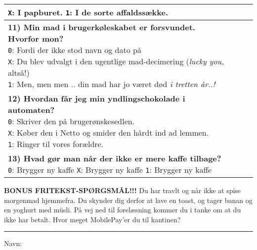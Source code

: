 \documentclass[a4paper]{article}
\begin{document}
\begin{center}
\begin{tabular}{|p{12cm}|p{0.2cm}|p{0.2cm}|p{0.2cm}|}
{  \texttt{X}: I papburet. \quad
  \texttt{1}: I de sorte affaldssække.
  \vspace{0.1cm}
} & & & \\\hline
\parbox{12cm}{
  \vspace{0.2cm}
  \textbf{11) Min mad i brugerkøleskabet er forsvundet. Hvorfor mon?}\\
  \texttt{0}: Fordi der ikke stod navn og dato på \quad \\
  \texttt{X}: Du blev udvalgt i den ugentlige mad-decimering (\textit{lucky you,} altså!) \quad \\
  \texttt{1}: Men, men men .. din mad har jo været død \textit{i tretten år..!}
  \vspace{0.1cm}
} & & & \\\hline
\parbox{12cm}{
  \vspace{0.2cm}
  \textbf{12) Hvordan får jeg min yndlingschokolade i automaten?} \\
  \texttt{0}: Skriver den på brugerønskesedlen. \\
  \texttt{X}: Køber den i Netto og smider den hårdt ind ad lemmen. \\
  \texttt{1}: Ringer til vores forældre.
  \vspace{0.1cm}
} & & & \\\hline
\parbox{12cm}{
  \vspace{0.2cm}
  \textbf{13) Hvad gør man når der ikke er mere kaffe tilbage?}\\
  \texttt{0}:  Brygger ny kaffe \quad
  \texttt{X}:  Brygger ny kaffe \quad
  \texttt{1}:  Brygger ny kaffe
  \vspace{0.1cm}
} & & & \\\hline
\end{tabular}

\vspace{0.5cm}

{\textbf{BONUS FRITEKST-SPØRGSMÅL!!!} Du har travlt og når ikke at spise
  morgenmad hjemmefra. Du skynder dig derfor at lave en toast, og tager banan og
  en yoghurt med müsli. På vej ned til forelæsning kommer du i tanke om at du
  ikke har betalt. Hvor meget MobilePay'er du til kantinen?
\\ \vspace{0.5cm} \rule{5cm}{0.4pt}}

\vspace{0.5cm}
{\large Navn: \hrulefill}
\end{center}
\end{document}
